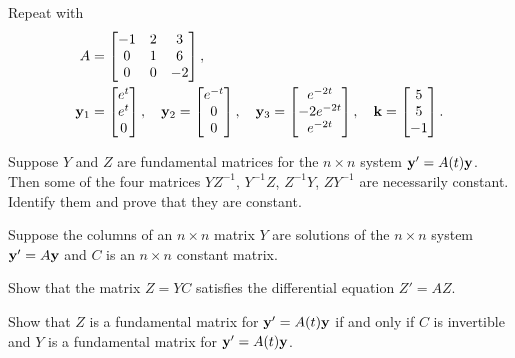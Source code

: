 \begin{exerciselist}
\item\label{exer:10.3.13}Repeat   with
\begin{align*}
 A&=\begin{bmatrix}-1&2&3\\0&1&6\\0&0&-2\end{bmatrix}, \\
\mathbf{y}_1&=\begin{bmatrix} e^t \\ e^t \\ 0\end{bmatrix},\quad
\mathbf{y}_2=\begin{bmatrix} e^{-t} \\ 0 \\ 0\end{bmatrix},\quad
\mathbf{y}_3=\begin{bmatrix} e^{-2t} \\-2e^{-2t}\\ e^{-2t}\end{bmatrix}, \quad
\mathbf{k}=\begin{bmatrix} 5 \\ 5 \\-1\end{bmatrix}.
\end{align*}

\item\label{exer:10.3.14}Suppose $Y$ and $Z$ are fundamental matrices for the $n\times n$
system $\mathbf{y}'=A(t)\mathbf{y}$. Then some of the four matrices
$YZ^{-1}$, $Y^{-1}Z$, $Z^{-1}Y$, $Z Y^{-1}$ are necessarily
constant. Identify them and prove that they are constant.

\item\label{exer:10.3.15}Suppose the columns of an $n\times n$ matrix $Y$ are solutions of
the $n\times n$ system $\mathbf{y}'=A\mathbf{y}$ and $C$ is an $n \times n$
constant matrix.

\begin{alist}
\item %
Show that the matrix $Z=YC$ satisfies the differential equation
$Z'=AZ$.

\item %
Show that $Z$ is a fundamental matrix for $\mathbf{y}'=A(t)\mathbf{y}$ if
and only if $C$ is invertible and $Y$ is a fundamental matrix for
$\mathbf{y}'=A(t)\mathbf{y}$.
\end{alist}


\end{exerciselist}
